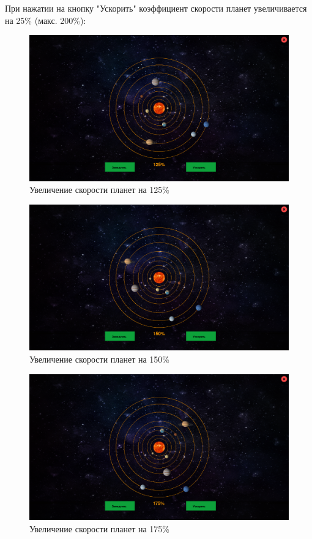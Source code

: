 \documentclass[14pt, oneside]{altsu-report}
\begin{document}
При нажатии на кнопку "Ускорить" коэффициент скорости планет увеличивается на 25\% (макс. 200\%):
\begin{figure}[H]
    \centering
    \includegraphics[width=0.8\linewidth]{src/test/up_quarter1.png}
    \caption{Увеличение скорости планет на 125\%}
    \label{fig:up-125}
\end{figure}
\begin{figure}[H]
    \centering
    \includegraphics[width=0.8\linewidth]{src/test/up_quarter2.png}
    \caption{Увеличение скорости планет на 150\%}
    \label{fig:up-150}
\end{figure}
\begin{figure}[H]
    \centering
    \includegraphics[width=0.8\linewidth]{src/test/up_quarter3.png}
    \caption{Увеличение скорости планет на 175\%}
    \label{fig:up-175}
\end{figure}
\end{document}
